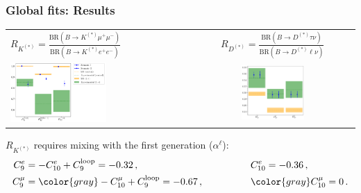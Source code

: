 \documentclass[mathserif, 10pt]{beamer}
\begin{document}
\begin{frame}
    \frametitle{Global fits: Results}

    \begin{center}
        \begin{tabular}{lc}
            $R_{K^{(*)}} = \frac{\mathrm{BR}(B\to K^{(*)}\mu^+ \mu^-)}{\mathrm{BR}(B\to K^{(*)}e^+ e^-)}$ & $R_{D^{(*)}} = \frac{\mathrm{BR}(B\to D^{(*)}\tau \nu)}{\mathrm{BR}(B\to D^{(*)}\ell \nu)}$ \\
            \includegraphics[width=0.55\textwidth]{figures/rotRKplot.pdf} &
            \includegraphics[width=0.4\textwidth]{figures/rotRDplot.pdf}
        \end{tabular}
    \end{center}
    $R_{K^{(*)}}$ requires mixing with the first generation ($\alpha^\ell$):
    \begin{align*}
        C_9^e   & = -C_{10}^e + C_9^\mathrm{loop} = -0.32\,, \qquad\qquad                 &  & C_{10}^e =-0.36\,,             \\
        C_9^\mu & = {\color{gray}-C_{10}^\mu} + C_9^\mathrm{loop} = -0.67\,, \qquad\qquad &  & {\color{gray}C_{10}^\mu =0}\,.
    \end{align*}
\end{frame}
\end{document}
